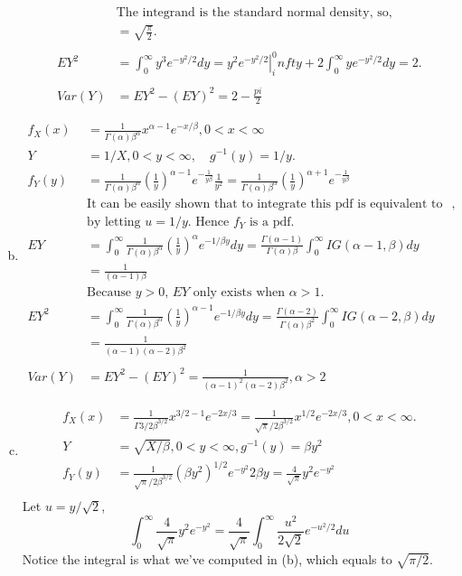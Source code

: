 \documentclass[letterpaper]{article}
\newcommand{\Gal}{\Gamma(\alpha)}
\newcommand{\Iy}{\frac{1}{y}}
\newcommand{\Beal}{\beta^\alpha}
\newcommand{\intzi}{\int_0^\infty}
\begin{document}
\begin{enumerate}[(a)]
\begin{align*}
    & \text{The integrand is the standard normal density, so},\\
    & = \sqrt{\frac{\pi}{2}}.\\
    \\
    EY^2 & = \intzi y^3 e^{-y^2/2} dy = \left. y^2 e^{-y^2/2} \right|^0_infty + 2 \intzi ye^{-y^2/2} dy = 2.\\
    \\
    Var(Y) & = EY^2 - (EY)^2 = 2-\frac{pi}{2}
    \end{align*}
    \item 
    \begin{align*}
    f_X(x) & = \frac{1}{\Gal \Beal} x^{\alpha-1} e^{-x/\beta}, 0 < x < \infty \\
    Y & = 1/X, 0 < y < \infty, \quad g^{-1}(y) = 1/y.\\
    f_Y(y) & = \frac{1}{\Gal \Beal} (\frac{1}{y})^{\alpha-1} e^{-\frac{1}{y\beta}} \frac{1}{y^2} = 
    \frac{1}{\Gal \Beal} (\frac{1}{y})^{\alpha+1} e^{-\frac{1}{y\beta}} \\
    & \text{It can be easily shown that to integrate this pdf is equivalent to integrate a gamma density},\\
    & \text{by letting $u = 1/y$. Hence $f_Y$ is a pdf}.\\ 
    EY & = \intzi \frac{1}{\Gal \Beal} (\Iy)^\alpha e^{-1/\beta y} dy = \frac{\Gamma(\alpha-1)}{\Gal \beta} \intzi IG(\alpha-1, \beta) dy \\
    & = \frac{1}{(\alpha-1)\beta} \\
    & \text{Because $y > 0$, $EY$ only exists when $\alpha > 1$.}\\
    EY^2 & = \intzi \frac{1}{\Gal \Beal} (\Iy)^{\alpha-1} e^{-1/\beta y} dy = \frac{\Gamma(\alpha-2)}{\Gal \beta^2} \intzi IG(\alpha-2, \beta) dy \\
    & = \frac{1}{(\alpha-1)(\alpha-2)\beta^2}\\
    \\
    Var(Y) & = EY^2 - (EY)^2 = \frac{1}{(\alpha-1)^2(\alpha-2)\beta^2}, \alpha > 2
    \end{align*}
    \item
    \begin{align*}
    f_X(x) & = \frac{1}{\Gamma{3/2}\beta^{3/2}} x^{3/2-1} e^{-2x/3} = \frac{1}{\sqrt{\pi}/2 \beta^{3/2}} x^{1/2} e^{-2x/3}, 0 < x < \infty.\\
    Y & = \sqrt{X/\beta}, 0 < y < \infty, g^{-1}(y) = \beta y^2 \\
    f_Y(y) & = \frac{1}{\sqrt{\pi}/2 \beta^{3/2}} (\beta y^2)^{1/2} e^{-y^2} 2\beta y = \frac{4}{\sqrt{\pi}} y^2 e^{-y^2}\\
    \end{align*}
    Let $u = y/\sqrt{2}$,
    \[
    \intzi \frac{4}{\sqrt{\pi}} y^2 e^{-y^2}  = \frac{4}{\sqrt{\pi}} \intzi \frac{u^2}{2\sqrt{2}} e^{-u^2/2}du
    \]
    Notice the integral is what we've computed in (b), which equals to $\sqrt{\pi/2}$. 
    

\end{enumerate}
\end{document}
